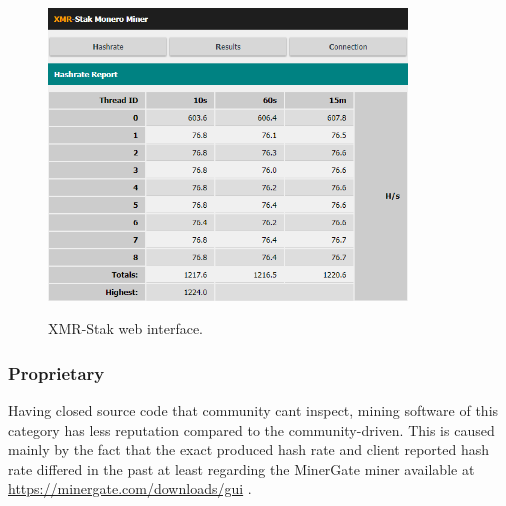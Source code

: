 \documentclass[
  printed, %
  table,   %
  nolof,     %
  nolot,     %
           oneside, color
]{fithesis3}
\begin{document}
\begin{figure}[H]
\begin{center}

    \vspace{-0.8em}
 \includegraphics[trim={0 0 0 0},clip,width=0.85\textwidth]{Screenshot_9.png}
    \caption{XMR-Stak web interface.}
    \vspace{-1.5em}
    \label{pic:withoutresdrawable}
\end{center}
    \end{figure}
    
\subsubsection{Proprietary}
Having closed source code that community cant inspect, mining software of this category has less reputation compared to the community-driven. This is caused mainly by the fact that the exact produced hash rate and client reported hash rate differed in the past at least regarding the MinerGate miner available at \url{https://minergate.com/downloads/gui} .
\iffalse
\end{document}
